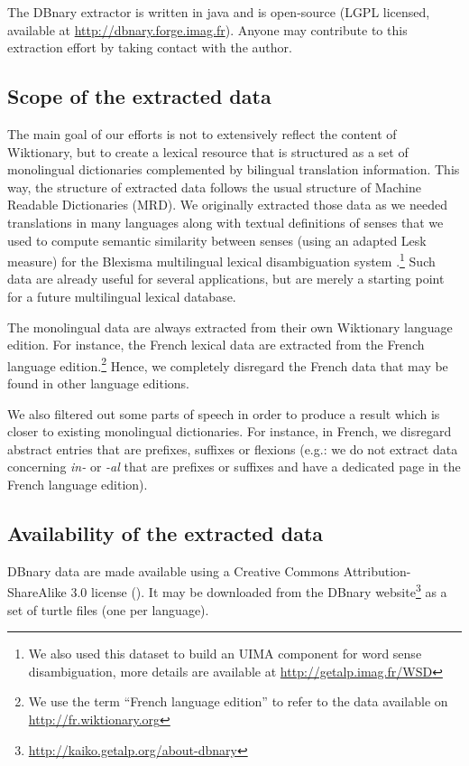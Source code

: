 \documentclass[sw]{iosart2c}
\begin{document}
The DBnary extractor is written in java and is open-source (LGPL licensed, available at \url{http://dbnary.forge.imag.fr}). Anyone may contribute to this extraction effort by taking contact with the author.

\subsection{Scope of the extracted data}

The main goal of our efforts is not to extensively reflect the content of Wiktionary, but to create a lexical resource that is structured as a set of monolingual dictionaries complemented by bilingual translation information. This way, the structure of extracted data follows the usual structure of Machine Readable Dictionaries (MRD). We originally extracted those data as we needed translations in many languages along with textual definitions of senses that we used to compute semantic similarity between senses (using an adapted Lesk measure) for the Blexisma multilingual lexical disambiguation system \cite{schwab2012coling}.\footnote{We also used this dataset to build an UIMA component for word sense disambiguation, more details are available at \url{http://getalp.imag.fr/WSD}} Such data are already useful for several applications, but are merely a starting point for a future multilingual lexical database.

The monolingual data are always extracted from their own Wiktionary language edition. For instance, the French lexical data are extracted from the French language edition.\footnote{We use the term ``French language edition'' to refer to the data available on \url{http://fr.wiktionary.org}} Hence, we completely disregard the French data that may be found in other language editions.

We also filtered out some parts of speech in order to produce a result which is closer to existing monolingual dictionaries. For instance, in French, we disregard abstract entries that are prefixes, suffixes or flexions (e.g.: we do not extract data concerning \textit{in-} or \textit{-al} that are prefixes or suffixes and have a dedicated page in the French language edition).

\subsection{Availability of the extracted data}

DBnary data are made available using a Creative Commons Attribution-ShareAlike 3.0 license (\ccbysa). It may be downloaded from the DBnary website\footnote{\url{http://kaiko.getalp.org/about-dbnary}} as a set of turtle files (one per language).
\end{document}
